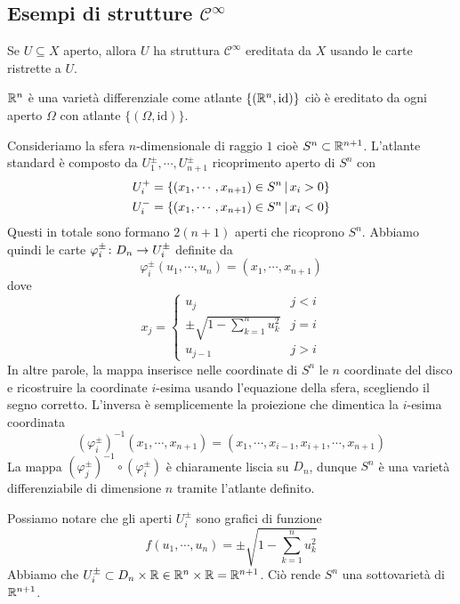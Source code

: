 \documentclass[a4paper]{article}
\begin{document}
\subsection{Esempi di strutture \(\mathcal C^\infty\)}

Se \(U \subseteq X\) aperto, allora \(U\)
ha struttura \(\mathcal C^\infty\) ereditata da \(X\)
usando le carte ristrette a \(U\).

\(\mathbb{R}^n\) è una varietà differenziale come atlante
\(\{(\mathbb{R}^n, \text{id})\}\)
ciò è ereditato da ogni aperto \(\Omega\)
con atlante \(\{(\Omega, \text{id})\}\).

\begin{snippetexample}{}
    Consideriamo la sfera \(n\)-dimensionale di raggio \(1\) cioè \(S^n \subset \mathbb{R}^{n+1}\).
    L'atlante standard è composto da \(U_1^{\pm}, \cdots, U_{n+1}^{\pm}\) ricoprimento aperto di \(S^n\) con
    \begin{align*}
        U_i^+ &= \{(x_1, \cdots, x_{n+1}) \in S^n \,|\, x_i > 0\} \\
        U_i^- &= \{(x_1, \cdots, x_{n+1}) \in S^n \,|\, x_i < 0\}
    \end{align*}
    Questi in totale sono formano \(2(n+1)\) aperti che ricoprono \(S^n\).
    Abbiamo quindi le carte \(\varphi_i^\pm \colon D_n \to U_i^\pm\)
    definite da
    \[
        \varphi_i^\pm(u_1, \cdots, u_n) = (x_1, \cdots, x_{n+1})
    \]
    dove
    \[
        x_j = \begin{cases}
            u_j & j<i \\
            \pm \sqrt{1 - \sum_{k=1}^n u_k^2} & j=i \\
            u_{j-1} & j>i
        \end{cases}
    \]
    In altre parole, la mappa inserisce nelle coordinate di \(S^n\) le \(n\) coordinate del disco e ricostruire la coordinate
    \(i\)-esima usando l'equazione della sfera, scegliendo il segno corretto.
    L'inversa è semplicemente la proiezione che dimentica la \(i\)-esima coordinata
    \[
        (\varphi_i^\pm)^{-1}(x_1, \cdots, x_{n+1}) = (x_1, \cdots, x_{i-1}, x_{i+1}, \cdots, x_{n+1})
    \]
    La mappa \((\varphi_j^\pm)^{-1} \circ (\varphi_i^\pm)\) è chiaramente liscia su \(D_n\), dunque
    \(S^n\) è una varietà differenziabile di dimensione \(n\) tramite l'atlante definito.
\end{snippetexample}

Possiamo notare che gli aperti \(U_i^\pm\) sono grafici di funzione \[
    f(u_1, \cdots, u_n) = \pm \sqrt{1 - \sum_{k=1}^n u_k^2}
\]
Abbiamo che \(U_i^\pm \subset D_n \times \mathbb{R} \in \mathbb{R}^n \times \mathbb{R} = \mathbb{R}^{n+1}\).
Ciò rende \(S^n\) una sottovarietà di \(\mathbb{R}^{n+1}\).
\end{document}
